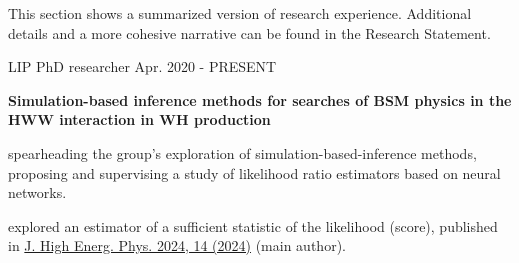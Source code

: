 
This section shows a summarized version of research experience. Additional details and a more cohesive narrative can be found in the Research Statement.

\begin{cventries}

    \cventry
    {LIP}
    {PhD researcher}
    {}
    {Apr. 2020 - PRESENT}
    {
        \textbf{Simulation-based inference methods for searches of BSM physics in the HWW interaction in WH production}\vspace{12pt}
        \begin{cvitems}      
            \item {spearheading the group's exploration of simulation-based-inference methods, proposing and supervising a study of likelihood ratio estimators based on neural networks.}
            \item {explored an estimator of a sufficient statistic of the likelihood (score), published in \href{https://doi.org/10.1007/JHEP04(2024)014}{J. High Energ. Phys. 2024, 14 (2024)} (main author).}
        \end{cvitems}
    }


\end{cventries}
